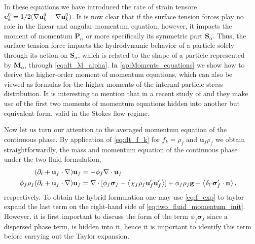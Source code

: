 In these equations we have introduced the rate of strain tensore $\textbf{e}_k^0 = 1/2 (\mathbf{\nabla} \textbf{u}_k^0 + \mathbf{\nabla} \textbf{u}_k^0)$. %
It is now clear that if the surface tension forces play no role in the linear and angular momentum equation, however, it impacts the moment of momentum $\textbf{P}_\alpha$ or more specifically its symmetric part $\textbf{S}_\alpha$.
Thus, the surface tension force impacts the hydrodynamic behavior of a particle solely through its action on $\textbf{S}_\alpha$, which is related to the shape of a particle represented by $\textbf{M}_\alpha$, through \ref{eq:dt_M_alpha}.
In \ref{ap:Moments_equations} we show how to derive the higher-order moment of momentum equations, which can also be viewed as formulas for the higher moments of the internal particle stress distribution. 
It is interesting to mention that in a recent study of \citet{dolata2021faxen} and \citet{zhou2020lamb} they make use of the first two moments of momentum equations hidden into another but equivalent form, valid in the Stokes flow regime. 



Now let us turn our attention to the averaged momentum equation of the continuous phase. 
By application of \ref{eq:dt_f_k} for $f_k = \rho_f$ and $\textbf{u}_f\rho_f$ we obtain straightforwardly, the mass and momentum equation of the continuous phase under the two fluid formulation, 
\begin{align}
    (\pddt + \textbf{u}_f\cdot \grad)\textbf{u}_f&=-\phi_f \div \textbf{u}_f\\
    \phi_f \rho_f(\pddt + \textbf{u}_f  \cdot \grad) \textbf{u}_f
    &= 
    \div [\phi_f \bm\sigma_f-  \avg{\chi_f\rho_f \textbf{u}_f'\textbf{u}_f'}]
    + \phi_f \rho_f \textbf{g}
    - \avg{\delta_\Gamma \bm\sigma_f'\cdot \textbf{n}},
    \label{eq:two_fluid_momentum_init}
\end{align}
respectively. 
To obtain the hybrid formulation one may use \ref{eq:f_exp} to taylor expand the last term on the right-hand side of \ref{eq:two_fluid_momentum_init}. 
However, it is first important to discuss the form of the term $\phi_f\bm\sigma_f$ since a dispersed phase term, is hidden into it, hence it is important to identify this term before carrying out the Taylor expansion. 


